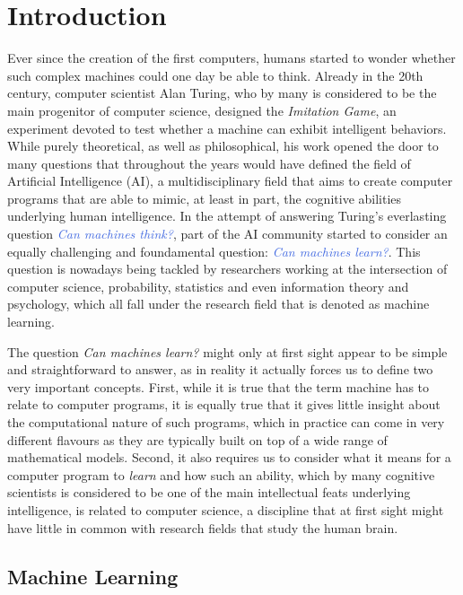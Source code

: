 \chapter{Introduction}
\label{ch:introduction}

Ever since the creation of the first computers, humans started to wonder whether such complex machines could one day be able to think. Already in the 20th century, computer scientist Alan Turing, who by many is considered to be the main progenitor of computer science, designed the \textit{Imitation Game}, an experiment devoted to test whether a machine can exhibit intelligent behaviors. While purely theoretical, as well as philosophical, his work opened the door to many questions that throughout the years would have defined the field of Artificial Intelligence (AI), a multidisciplinary field that aims to create computer programs that are able to mimic, at least in part, the cognitive abilities underlying human intelligence. In the attempt of answering Turing's everlasting question \textcolor{RoyalBlue}{\textit{Can machines think?}}, part of the AI community started to consider an equally challenging and foundamental question: \textcolor{RoyalBlue}{\textit{Can machines learn?}}. This question is nowadays being tackled by researchers working at the intersection of computer science, probability, statistics and even information theory and psychology, which all fall under the research field that is denoted as machine learning.

The question \textit{Can machines learn?} might only at first sight appear to be simple and straightforward to answer, as in reality it actually forces us to define two very important concepts. First, while it is true that the term machine has to relate to computer programs, it is equally true that it gives little insight about the computational nature of such programs, which in practice can come in very different flavours as they are typically built on top of a wide range of mathematical models. Second, it also requires us to consider what it means for a computer program to \textit{learn} and how such an ability, which by many cognitive scientists is considered to be one of the main intellectual feats underlying intelligence, is related to computer science, a discipline that at first sight might have little in common with research fields that study the human brain. 

\section*{Machine Learning}

